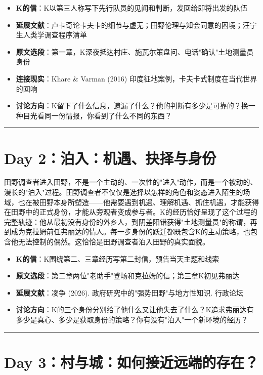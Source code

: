 \documentclass[11pt, a4paper]{ctexart}
\newcommand{\daysep}{\vspace{0.5em}\noindent\rule{\textwidth}{0.2pt}\vspace{0.8em}}
\begin{document}
\begin{itemize}
  \item \textbf{K的信}：K以第三人称写下先行队员的见闻和判断，发回给即将出发的队伍
  \item \textbf{延展文献}：卢卡奇论卡夫卡的细节与虚无；田野伦理与知会同意的困境；汪宁生人类学调查程序清单
  \item \textbf{原文选段}：第一章，K深夜抵达村庄、施瓦尔策盘问、电话"确认"土地测量员身份
  \item \textbf{连接现实}：Khare \& Varman (2016) 印度征地案例，卡夫卡式制度在当代世界的回响
  \item \textbf{讨论方向}：K留下了什么信息，遗漏了什么？他的判断有多少是可靠的？换一种目光看同一份情报，你看到了什么不同的东西？
\end{itemize}

\daysep

\section*{Day 2：泊入：机遇、抉择与身份}

田野调查者进入田野，不是一个主动的、一次性的"进入"动作，而是一个被动的、漫长的"泊入"过程。田野调查者不仅仅是选择以怎样的角色和姿态进入陌生的场域，也在被田野本身所塑造——他需要遇到机遇、理解机遇、抓住机遇，才能获得在田野中的正式身份，才能从旁观者变成参与者。K的经历恰好呈现了这个过程的完整轨迹：他从最初没有身份的外乡人，到阴差阳错获得"土地测量员"的称谓，再到成为克拉姆前任弗丽达的情人。每一步身份的跃迁都既包含K的主动策略，也包含他无法控制的偶然。这恰恰是田野调查者泊入田野的真实面貌。

\vspace{0.5em}

\begin{itemize}
  \item \textbf{K的信}：K围绕第二、三章经历写第二封信，预告当天主题和线索
  \item \textbf{原文选段}：第二章两位"老助手"登场和克拉姆的信；第三章K初见弗丽达
  \item \textbf{延展文献}：凌争 (2026). 政府研究中的"强势田野"与地方性知识. 行政论坛
  \item \textbf{讨论方向}：K的三个身份分别给了他什么又让他失去了什么？K追求弗丽达有多少是真心、多少是获取身份的策略？你有没有"泊入"一个新环境的经历？
\end{itemize}

\daysep

\section*{Day 3：村与城：如何接近远端的存在？}
\end{document}
